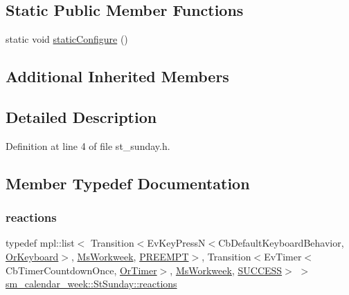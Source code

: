 \subsection*{Static Public Member Functions}
\begin{DoxyCompactItemize}
\item 
static void \hyperlink{structsm__calendar__week_1_1StSunday_ac9d8f202395f72b238783630e8c1d2f2}{static\+Configure} ()
\end{DoxyCompactItemize}
\subsection*{Additional Inherited Members}


\subsection{Detailed Description}


Definition at line 4 of file st\+\_\+sunday.\+h.



\subsection{Member Typedef Documentation}
\mbox{\label{structsm__calendar__week_1_1StSunday_af2828352a507a4c972e43b318bb59a51}} 
\subsubsection{\texorpdfstring{reactions}{reactions}}
{\footnotesize\ttfamily typedef mpl\+::list$<$ Transition$<$Ev\+Key\+PressN$<$Cb\+Default\+Keyboard\+Behavior, \hyperlink{classsm__calendar__week_1_1OrKeyboard}{Or\+Keyboard}$>$, \hyperlink{classsm__calendar__week_1_1MsWorkweek}{Ms\+Workweek}, \hyperlink{classPREEMPT}{P\+R\+E\+E\+M\+PT}$>$, Transition$<$Ev\+Timer$<$Cb\+Timer\+Countdown\+Once, \hyperlink{classsm__calendar__week_1_1OrTimer}{Or\+Timer}$>$, \hyperlink{classsm__calendar__week_1_1MsWorkweek}{Ms\+Workweek}, \hyperlink{classSUCCESS}{S\+U\+C\+C\+E\+SS}$>$ $>$ \hyperlink{structsm__calendar__week_1_1StSunday_af2828352a507a4c972e43b318bb59a51}{sm\+\_\+calendar\+\_\+week\+::\+St\+Sunday\+::reactions}}



